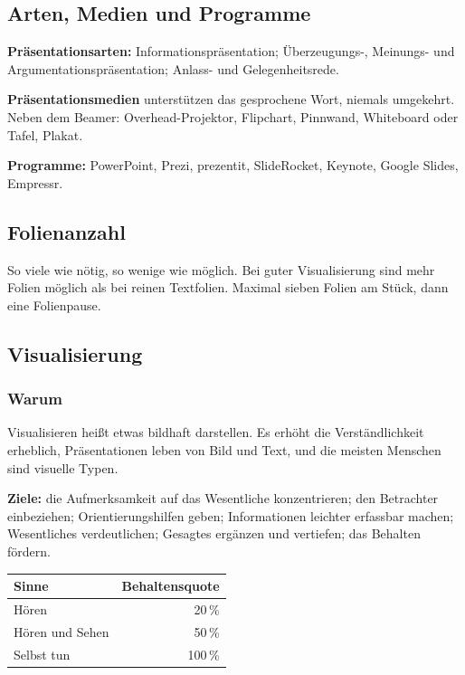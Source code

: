 \documentclass[12pt, a4paper]{article}
\begin{document}
\subsection{Arten, Medien und Programme}

\textbf{Präsentationsarten:} Informationspräsentation; Überzeugungs-,
Meinungs- und Argumentationspräsentation; Anlass- und Gelegenheitsrede.

\textbf{Präsentationsmedien} unterstützen das gesprochene Wort, niemals
umgekehrt. Neben dem Beamer: Overhead-Projektor, Flipchart, Pinnwand,
Whiteboard oder Tafel, Plakat.

\textbf{Programme:} PowerPoint, Prezi, prezentit, SlideRocket, Keynote,
Google Slides, Empressr.

\subsection{Folienanzahl}

So viele wie nötig, so wenige wie möglich. Bei guter Visualisierung sind mehr
Folien möglich als bei reinen Textfolien. Maximal sieben Folien am Stück,
dann eine \glqq Folienpause\grqq{}.

\subsection{Visualisierung}

\subsubsection{Warum}

Visualisieren heißt \glqq etwas bildhaft darstellen\grqq{}. Es erhöht die
Verständlichkeit erheblich, Präsentationen leben von Bild und Text, und die
meisten Menschen sind visuelle Typen.

\textbf{Ziele:} die Aufmerksamkeit auf das Wesentliche konzentrieren; den
Betrachter einbeziehen; Orientierungshilfen geben; Informationen leichter
erfassbar machen; Wesentliches verdeutlichen; Gesagtes ergänzen und
vertiefen; das Behalten fördern.

\begin{center}
\begin{tabular}{lr}
\textbf{Sinne} & \textbf{Behaltensquote}\\\hline
Hören & 20\,\%\\
Hören und Sehen & 50\,\%\\
Selbst tun & 100\,\%\\
\end{tabular}
\end{center}
\end{document}
